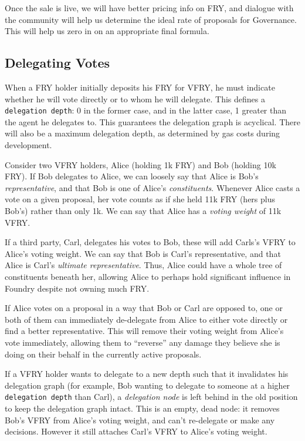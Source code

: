 \documentclass{article}
\begin{document}
Once the sale is live, we will have better pricing info on FRY, and dialogue with the community will help us determine the ideal rate of proposals for Governance. This will help us zero in on an appropriate final formula.

\subsection{Delegating Votes} \label{delegating}

When a FRY holder initially deposits his FRY for VFRY, he must indicate whether he will vote directly or to whom he will delegate. This defines a \verb|delegation depth|: 0 in the former case, and in the latter case, 1 greater than the agent he delegates to. This guarantees the delegation graph is acyclical. There will also be a maximum delegation depth, as determined by gas costs during development.

Consider two VFRY holders, Alice (holding 1k FRY) and Bob (holding 10k FRY). If Bob delegates to Alice, we can loosely say that Alice is Bob's \textit{representative}, and that Bob is one of Alice's \textit{constituents}. Whenever Alice casts a vote on a given proposal, her vote counts as if she held 11k FRY (hers plus Bob's) rather than only 1k. We can say that Alice has a \textit{voting weight} of 11k VFRY.

If a third party, Carl, delegates his votes to Bob, these will add Carls's VFRY to Alice's voting weight. We can say that Bob is Carl's representative, and that Alice is Carl's \textit{ultimate representative}. Thus, Alice could have a whole tree of constituents beneath her, allowing Alice to perhaps hold significant influence in Foundry despite not owning much FRY.

If Alice votes on a proposal in a way that Bob or Carl are opposed to, one or both of them can immediately de-delegate from Alice to either vote directly or find a better representative. This will remove their voting weight from Alice's vote immediately, allowing them to ``reverse'' any damage they believe she is doing on their behalf in the currently active proposals.

If a VFRY holder wants to delegate to a new depth such that it invalidates his delegation graph (for example, Bob wanting to delegate to someone at a higher \verb|delegation depth| than Carl), a \textit{delegation node} is left behind in the old position to keep the delegation graph intact. This is an empty, dead node: it removes Bob's VFRY from Alice's voting weight, and can't re-delegate or make any decisions. However it still attaches Carl's VFRY to Alice's voting weight.
\end{document}
